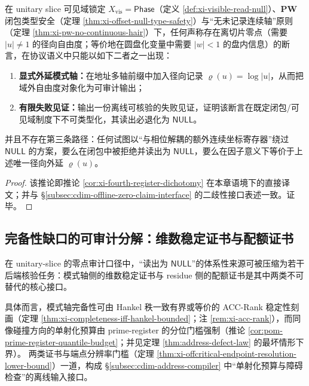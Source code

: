 \begin{corollary}\label{cor:cdim-fourth-register-dichotomy}
在 unitary slice 可见域锁定 \(X_{\mathrm{vis}}=\mathsf{Phase}\)（定义 \ref{def:xi-visible-read-null}）、\(\mathbf{PW}\) 闭包类型安全（定理 \ref{thm:xi-offset-null-type-safety}）与“无未记录连续轴”原则（定理 \ref{thm:xi-pw-no-continuous-hair}）下，任何声称存在离切片零点（需要 \(|u|\neq 1\) 的径向自由度；等价地在圆盘化变量中需要 \(|w|<1\) 的盘内信息）的断言，在协议语义中只能以如下二者之一出现：
\begin{enumerate}
  \item \textbf{显式外延模式轴：}在地址多轴前缀中加入径向记录 \(\varrho(u)=\log|u|\)，从而把域外自由度对象化为可审计输出；
  \item \textbf{有限失败见证：}输出一份离线可核验的失败见证，证明该断言在既定闭包/可见域制度下不可类型化，其读出必退化为 \(\mathsf{NULL}\)。
\end{enumerate}
并且不存在第三条路径：任何试图以“与相位解耦的额外连续坐标寄存器”绕过 \(\mathsf{NULL}\) 的方案，要么在闭包中被拒绝并读出为 \(\mathsf{NULL}\)，要么在因子意义下等价于上述唯一径向外延 \(\varrho(u)\)。
\end{corollary}
\begin{proof}
该推论即推论 \ref{cor:xi-fourth-register-dichotomy} 在本章语境下的直接译文；并与 \S\ref{subsec:cdim-offline-zero-claim-interface} 的二歧性接口表述一致。证毕。
\end{proof}

\subsection{完备性缺口的可审计分解：维数稳定证书与配额证书}\label{subsec:cdim-completeness-gap-audit-decomposition}
在 unitary-slice 的零点审计口径中，“读出为 \(\mathsf{NULL}\)”的体系性来源可被压缩为若干后端核验任务：模式轴侧的维数稳定证书与 residue 侧的配额证书是其中两类不可替代的核心接口。
\par
具体而言，模式轴完备性可由 Hankel 秩一致有界或等价的 ACC-Rank 稳定性刻画（定理 \ref{thm:xi-completeness-iff-hankel-bounded}；注 \ref{rem:xi-acc-rank}），而同像碰撞方向的单射化预算由 prime-register 的分位门槛强制（推论 \ref{cor:pom-prime-register-quantile-budget}；并见定理 \ref{thm:address-defect-law} 的最坏情形下界）。
两类证书与端点分辨率门槛（定理 \ref{thm:xi-offcritical-endpoint-resolution-lower-bound}）一道，构成 \S\ref{subsec:cdim-address-compiler} 中“单射化预算与障碍检查”的离线输入接口。


